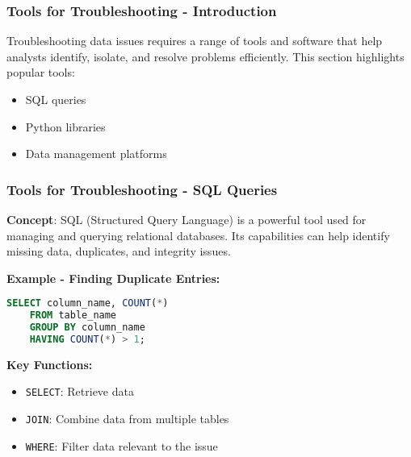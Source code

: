 \documentclass{beamer}
\begin{document}
\begin{frame}[fragile]
    \frametitle{Tools for Troubleshooting - Introduction}
    Troubleshooting data issues requires a range of tools and software that help analysts identify, isolate, and resolve problems efficiently. This section highlights popular tools:
    
    \begin{itemize}
        \item SQL queries
        \item Python libraries
        \item Data management platforms
    \end{itemize}
\end{frame}

\begin{frame}[fragile]
    \frametitle{Tools for Troubleshooting - SQL Queries}
    
    \textbf{Concept}: SQL (Structured Query Language) is a powerful tool used for managing and querying relational databases. Its capabilities can help identify missing data, duplicates, and integrity issues.
    
    \textbf{Example - Finding Duplicate Entries:}
    \begin{lstlisting}[language=SQL]
    SELECT column_name, COUNT(*)
    FROM table_name
    GROUP BY column_name
    HAVING COUNT(*) > 1;
    \end{lstlisting}

    \textbf{Key Functions:}
    \begin{itemize}
        \item \texttt{SELECT}: Retrieve data
        \item \texttt{JOIN}: Combine data from multiple tables
        \item \texttt{WHERE}: Filter data relevant to the issue
    \end{itemize}
\end{frame}
\end{document}
